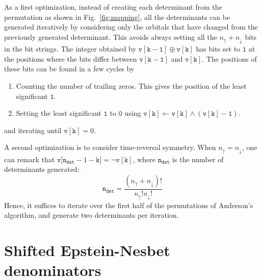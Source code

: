 \documentclass[aip,jcp,reprint,showkeys]{revtex4-1}
\newcommand{\up}{\uparrow}
\newcommand{\dn}{\downarrow}
\newcommand{\one}{{\texttt{1}}}
\newcommand{\zero}{{\texttt{0}}}
\begin{document}
As a first optimization, instead of creating each determinant from the
permutation as shown in Fig.~\ref{fig:mapping}, all the determinants can be
generated iteratively by considering only the orbitals that have changed
from the previously generated determinant. This avoids always setting all the
$n_\up+n_\dn$ bits in the bit strings.
The integer obtained by $\mathtt{v[k-1]} \oplus \mathtt{v[k]}$ has bits
set to $\one$ at the positions where the bits differ between $\mathtt{v[k-1]}$ and
$\mathtt{v[k]}$. The positions of these bits can be found in a few cycles by
\begin{enumerate}
\item Counting the number of trailing zeros. This gives the position of the least significant $\one$.
\item Setting the least significant $\one$ to $\zero$ using
      $\mathtt{v[k] \gets v[k] \wedge (v[k]-1)}$.
\end{enumerate}
and iterating until $\mathtt{v[k]} = 0$. 

A second optimization is to consider time-reversal symmetry. When $n_\up =
n_\dn$, one can remark that ${\mathtt{v[n_{det}}-1-\mathtt{k]} = \neg \mathtt{v[k]}}$, 
where $\mathtt{n_{det}}$ is the number of determinants generated:
\begin{equation}
\mathtt{n_{det}} = \frac{(n_\up +n_\dn)!}{n_\up! n_\dn!}
\end{equation}
Hence, it suffices to iterate over the first half of the permutations of Anderson's
algorithm, and generate two determinants per iteration.


\section{Shifted Epstein-Nesbet denominators}
\end{document}
